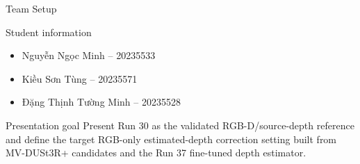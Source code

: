 \begin{frame}
  \titlepage
\end{frame}

\begin{frame}{Team Setup}
  \begin{block}{Student information}
    \begin{itemize}
      \item Nguyễn Ngọc Minh -- 20235533
      \item Kiều Sơn Tùng -- 20235571
      \item Đặng Thịnh Tường Minh -- 20235528
    \end{itemize}
  \end{block}

  \vspace{0.4cm}
  \begin{block}{Presentation goal}
    Present Run 30 as the validated RGB-D/source-depth reference and define the
    target RGB-only estimated-depth correction setting built from MV-DUSt3R+
    candidates and the Run 37 fine-tuned depth estimator.
  \end{block}
\end{frame}
